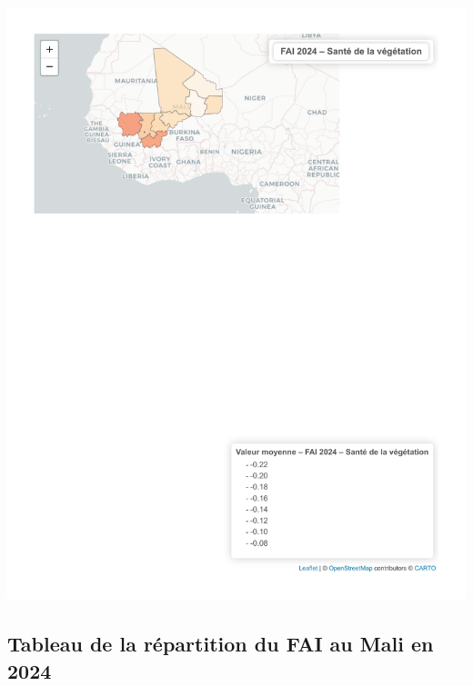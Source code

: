\documentclass[
]{book}
\begin{document}
\includegraphics{Atlas-Spectral-Sahel_files/figure-latex/vegetation-fai-1.pdf}

\subsection{Tableau de la répartition du FAI au Mali en 2024}\label{tableau-de-la-ruxe9partition-du-fai-au-mali-en-2024}
\end{document}
